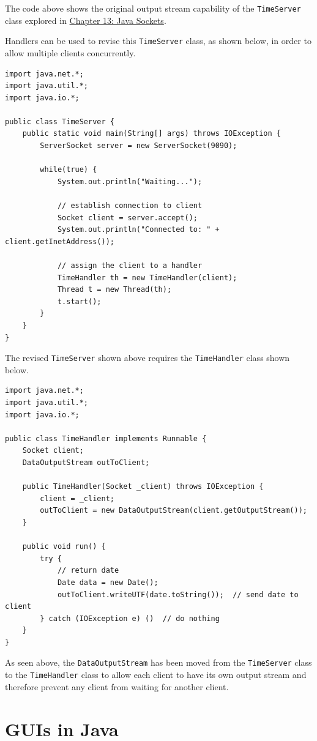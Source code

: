 \documentclass[a4paper]{systems-software}
\begin{document}
The code above shows the original output stream capability of the \texttt{TimeServer} class explored in \hyperref[chap:13]{Chapter 13: Java Sockets}.

Handlers can be used to revise this \texttt{TimeServer} class, as shown below, in order to allow multiple clients concurrently.

\begin{lstlisting}[title={Revised TimeServer class.}]
import java.net.*;
import java.util.*;
import java.io.*;

public class TimeServer {
	public static void main(String[] args) throws IOException {
		ServerSocket server = new ServerSocket(9090);

		while(true) {
			System.out.println("Waiting...");

			// establish connection to client
			Socket client = server.accept();
			System.out.println("Connected to: " + client.getInetAddress());

			// assign the client to a handler
			TimeHandler th = new TimeHandler(client);
			Thread t = new Thread(th);
			t.start();
		}
	}
}
\end{lstlisting}

\newpage

The revised \texttt{TimeServer} shown above requires the \texttt{TimeHandler} class shown below.

\begin{lstlisting}[title={TimeHandler class.}]
import java.net.*;
import java.util.*;
import java.io.*;

public class TimeHandler implements Runnable {
	Socket client;
	DataOutputStream outToClient;
	
	public TimeHandler(Socket _client) throws IOException {
		client = _client;
		outToClient = new DataOutputStream(client.getOutputStream());
	}
	
	public void run() {
		try {
			// return date
			Date data = new Date();
			outToClient.writeUTF(date.toString());  // send date to client
		} catch (IOException e) ()  // do nothing
	}
}
\end{lstlisting}

As seen above, the \texttt{DataOutputStream} has been moved from the \texttt{TimeServer} class to the \texttt{TimeHandler} class to allow each client to have its own output stream and therefore prevent any client from waiting for another client.


\chapter{GUIs in Java}
\end{document}
